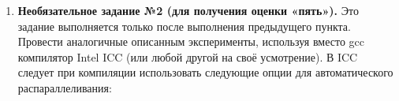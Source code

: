 {\begin{enumerate}
     \item\textbf{Необязательное задание №2 (для получения оценки «пять»).} Это задание выполняется только после выполнения предыдущего пункта. Провести аналогичные описанным эксперименты, используя вместо gcc компилятор Intel ICC (или любой другой на своё усмотрение). В ICC следует при компиляции использовать следующие опции для автоматического распараллеливания: 
	\end{enumerate}
	
}
